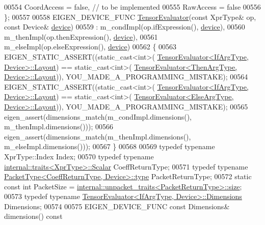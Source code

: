 \begin{DoxyCode}
00554     CoordAccess = \textcolor{keyword}{false},  \textcolor{comment}{// to be implemented}
00555     RawAccess = \textcolor{keyword}{false}
00556   \};
00557 
00558   EIGEN\_DEVICE\_FUNC \hyperlink{struct_eigen_1_1_tensor_evaluator}{TensorEvaluator}(\textcolor{keyword}{const} XprType& op, \textcolor{keyword}{const} Device& 
      \hyperlink{struct_eigen_1_1_tensor_evaluator_a98b51809ed8f7a1f736eb7b952b9636e}{device})
00559     : m\_condImpl(op.ifExpression(), \hyperlink{struct_eigen_1_1_tensor_evaluator_a98b51809ed8f7a1f736eb7b952b9636e}{device}),
00560       m\_thenImpl(op.thenExpression(), \hyperlink{struct_eigen_1_1_tensor_evaluator_a98b51809ed8f7a1f736eb7b952b9636e}{device}),
00561       m\_elseImpl(op.elseExpression(), \hyperlink{struct_eigen_1_1_tensor_evaluator_a98b51809ed8f7a1f736eb7b952b9636e}{device})
00562   \{
00563     EIGEN\_STATIC\_ASSERT((static\_cast<int>(
      \hyperlink{struct_eigen_1_1_tensor_evaluator}{TensorEvaluator<IfArgType, Device>::Layout}) == static\_cast<int>(
      \hyperlink{struct_eigen_1_1_tensor_evaluator}{TensorEvaluator<ThenArgType, Device>::Layout})), 
      YOU\_MADE\_A\_PROGRAMMING\_MISTAKE);
00564     EIGEN\_STATIC\_ASSERT((static\_cast<int>(
      \hyperlink{struct_eigen_1_1_tensor_evaluator}{TensorEvaluator<IfArgType, Device>::Layout}) == static\_cast<int>(
      \hyperlink{struct_eigen_1_1_tensor_evaluator}{TensorEvaluator<ElseArgType, Device>::Layout})), 
      YOU\_MADE\_A\_PROGRAMMING\_MISTAKE);
00565     eigen\_assert(dimensions\_match(m\_condImpl.dimensions(), m\_thenImpl.dimensions()));
00566     eigen\_assert(dimensions\_match(m\_thenImpl.dimensions(), m\_elseImpl.dimensions()));
00567   \}
00568 
00569   \textcolor{keyword}{typedef} \textcolor{keyword}{typename} XprType::Index Index;
00570   \textcolor{keyword}{typedef} \textcolor{keyword}{typename} \hyperlink{struct_eigen_1_1internal_1_1traits}{internal::traits<XprType>::Scalar} CoeffReturnType;
00571   \textcolor{keyword}{typedef} \textcolor{keyword}{typename} \hyperlink{group___sparse_core___module}{PacketType<CoeffReturnType, Device>::type} 
      PacketReturnType;
00572   \textcolor{keyword}{static} \textcolor{keyword}{const} \textcolor{keywordtype}{int} PacketSize = 
      \hyperlink{struct_eigen_1_1internal_1_1unpacket__traits}{internal::unpacket\_traits<PacketReturnType>::size};
00573   \textcolor{keyword}{typedef} \textcolor{keyword}{typename} \hyperlink{struct_eigen_1_1_tensor_evaluator}{TensorEvaluator<IfArgType, Device>::Dimensions}
       Dimensions;
00574 
00575   EIGEN\_DEVICE\_FUNC \textcolor{keyword}{const} Dimensions& dimensions()\textcolor{keyword}{ const}

\end{DoxyCode}

